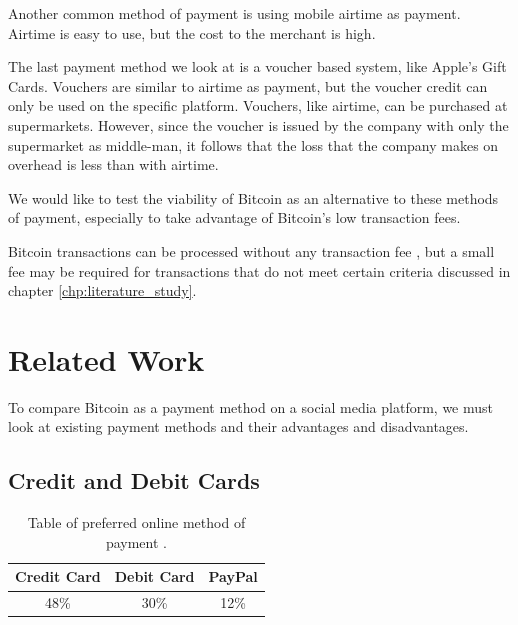 Another common method of payment is using mobile airtime as payment. Airtime is easy to use, but the cost to the merchant is high.

The last payment method we look at is a voucher based system, like Apple's Gift Cards. Vouchers are similar to airtime as payment, but the voucher credit can only be used on the specific platform. Vouchers, like airtime, can be purchased at supermarkets. However, since the voucher is issued by the company with only the supermarket as middle-man, it follows that the loss that the company makes on overhead is less than with airtime.

We would like to test the viability of Bitcoin as an alternative to these methods of payment, especially to take advantage of Bitcoin's low transaction fees.

Bitcoin transactions can be processed without any transaction fee \cite{bitcoinwiki}, but a small fee may be required for transactions that do not meet certain criteria discussed in chapter \ref{chp:literature_study}.




\section{Related Work}

To compare Bitcoin as a payment method on a social media platform, we must look at existing payment methods and their advantages and disadvantages. 

\subsection{Credit and Debit Cards}

\begin{table}
	\begin{center}
		\caption{Table of preferred online method of payment \cite{tsys}.} 
		\begin{tabular}	{ | c | c | c |}
		\hline
		Credit Card & Debit Card & PayPal \\ \hline
		48\% & 30\% & 12\% \\ \hline
	 
		\end{tabular}
		
		\label{tbl:preferred_payment}
	\end{center}
\end{table}

